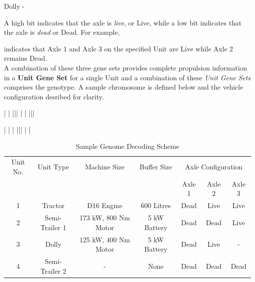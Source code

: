 \documentclass[ExampleMasters.tex]{subfiles}
\begin{document}
			\centerline{Dolly - }
			\vspace{0.1in}

			A high bit indicates that the axle is \textit{live}, or Live, while a low bit indicates that the axle is \textit{dead} or Dead. For example,\\

			\centerline{}
			\vspace{0.1in}

			indicates that Axle 1 and Axle 3 on the specified Unit are Live while Axle 2 remains Dead.\\

		A combination of these three gene sets provides complete propulsion information in a \textbf{Unit Gene Set} for a single Unit and a combination of these \textit{Unit Gene Sets} comprises the genotype. A sample chromosome is defined below and the vehicle configuration desribed for clarity.\\


			\centerline{\framebox{0} | \framebox{0} | \framebox{1} ||| \framebox{0}\framebox{1} | \framebox{0} |  |||} 
			\centerline{|  | \framebox{0} |  ||| \framebox{0} \framebox{1} | \framebox{0} | }

		\begin{table}[H]
			\caption{Sample Genome Decoding Scheme}
			\centering
			\begin{tabular}{c c c c c c c}
			\hline\hline
			Unit No. & Unit Type & Machine Size & Buffer Size & \multicolumn{3}{c}{Axle Configuration}\\ \cline{5-7}
			& & & & Axle 1 & Axle 2 & Axle 3\\
			\hline
			1 & Tractor & D16 Engine & 600 Litres & Dead & Live & Live \\
			2 & Semi-Trailer 1 & 173 kW, 800 Nm  Motor & 5 kW Battery & Dead & Dead & Live \\
			3 & Dolly & 125 kW, 400 Nm  Motor & 5 kW Battery & Dead & Live & - \\
			4 & Semi-Trailer 2 & - & None & Dead & Dead & Dead \\
			\hline
			\end{tabular}
			\label{table:genomeDecoding}
		\end{table}
\end{document}

